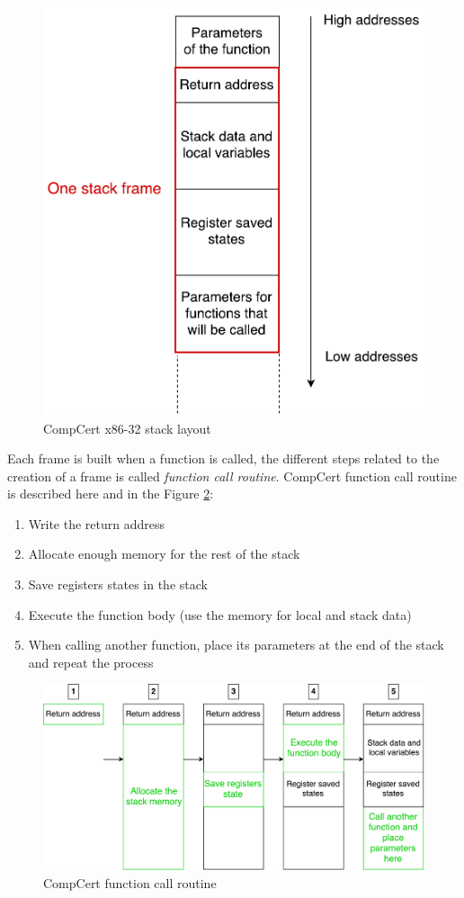 \documentclass[11pt]{sdm}
\begin{document}
\begin{figure}
\centering
\includegraphics[scale=0.5]{images/stack_layout.pdf}
\caption{CompCert x86-32 stack layout}
\label{stack_layout}
\end{figure}

Each frame is built when a function is called, the different steps related to the creation of a frame is called \textit{function call routine}.
CompCert function call routine is described here and in the Figure \ref{call_routine}:
\begin{enumerate}
	\item Write the return address
	\item Allocate enough memory for the rest of the stack
	\item Save registers states in the stack
	\item Execute the function body (use the memory for local and stack data)
	\item When calling another function, place its parameters at the end of the stack and repeat the process
\end{enumerate}

\begin{figure}
\centering
\includegraphics[scale=0.5]{images/call_routine.pdf}
\caption{CompCert function call routine}
\label{call_routine}
\end{figure}
\end{document}
